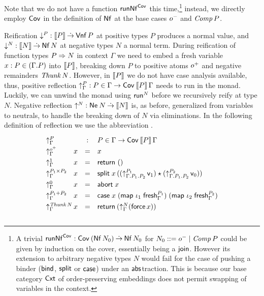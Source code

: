 \documentclass[sigconf,screen,fleqn]{acmart} %
\begin{document}
Note that we do not have a function
$\trunNf[\Cov]$
this time,\footnote{%
A trivial $\trunNf[\Cov] : \Cov\,(\tNf\,N_0) \todot \tNf\,N_0$
for $N_0 ::= \natom \mid \Comp P$ could be given by induction on the
cover, essentially being a $\tjoin$.  However its extension to
arbitrary negative types $N$ would fail for the case of pushing a
binder ($\tbind$, $\tsplit$ or $\tcase$) under an $\tabs$traction.
This is because
our base category $\Cxt$ of order-preserving embeddings
does not permit swapping of variables in the context.
}
instead, we
directly employ $\Cov$ in the definition of $\tNf$ at the base cases
$\natom$ and $\Comp P$.


Reification $\down P : \den P \todot \tVNf\,P$ at positive types $P$ produces
a normal value, and $\down N : \den N \todot \tNf\,N$ at negative
types $N$ a
normal term.  During reification of function types $P \To N$ in
context $\Gamma$ we need to embed a fresh variable
$x : P \in (\cext \Gamma P)$ into $\den P$, breaking down $P$ to
positive atoms $\patom$ and negative remainders $\Thunk N$.
However, in $\den P$ we do not have case analysis available, thus,
positive reflection $\upG P : P \in \Gamma \to \Cover {\den P} \Gamma$
needs to run in the monad.
Luckily, we can unwind the monad using $\trun^N$ before we recursively
reify at type $N$.
Negative reflection $\up N : \tNe\,N \todot \den N$ is, as
before, generalized from variables to neutrals, to handle the breaking
down of $N$ via eliminations.
%
In the following definition of reflection we use the abbreviation
.
\[
\def\arraystretch{1.3}
\begin{array}{l@{\,}lcl}%
  \multicolumn 2 l {\upG P} & : & P \in \Gamma \to \Cov\,\den P \, \Gamma\\
  \upG {\patom}         & x & = & x \\
  \upG {\tyone}         & x & = & \treturn\;\ttempty \\
  \upG {P_1 \times P_2} & x & = & \tsplit\;x\,
    \left(
     (\up[\cext{\cext \Gamma {P_1}}{P_2}]{P_1}\,\vv1)
     \star
     (\up[\cext{\cext \Gamma {P_1}}{P_2}]{P_2}\,\vv0)
    \right) \\
  \upG{\tyzero}         & x & = & \tabort\;x \\
  \upG{P_1 + P_2}       & x & = & \tcase\;x
    \; (\tmap\;\iota_1\;\tfresh^{P_1}_\Gamma)
    \; (\tmap\;\iota_2\;\tfresh^{P_2}_\Gamma)
    \\
  \upG{\Thunk N} & x & = & \treturn\,(\upG N (\tforce\,x))
\\[2ex]
\end{array}
\]
\end{document}

